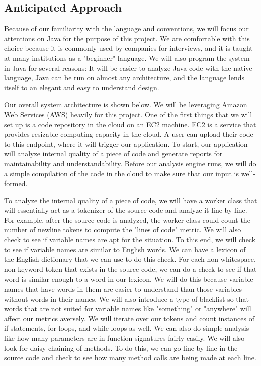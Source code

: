 \documentclass{sig-alternate}
\begin{document}
\subsection{Anticipated Approach}
\label{subsec:approach}
Because of our familiarity with the language and conventions, we will focus our attentions on Java for the purpose of this project. We are comfortable with this choice because it is commonly used by companies for interviews, and it is taught at many institutions as a "beginner" language. We will also program the system in Java for several reasons: It will be easier to analyze Java code with the native language, Java can be run on almost any architecture, and the language lends itself to an elegant and easy to understand design.

Our overall system architecture is shown below. We will be leveraging Amazon Web Services (AWS) heavily for this project. One of the first things that we will set up is a code repository in the cloud on an EC2 machine. EC2 is a service that provides resizable computing capacity in the cloud. A user can upload their code to this endpoint, where it will trigger our application. To start, our application will analyze internal quality of a piece of code and generate reports for maintainability and understandability. Before our analysis engine runs, we will do a simple compilation of the code in the cloud to make sure that our input is well-formed.

To analyze the internal quality of a piece of code, we will have a worker class that will essentially act as a tokenizer of the source code and analyze it line by line. For example, after the source code is analyzed, the worker class could count the number of newline tokens to compute the "lines of code" metric. We will also check to see if variable names are apt for the situation. To this end, we will check to see if variable names are similar to English words. We can have a lexicon of the English dictionary that we can use to do this check. For each non-whitespace, non-keyword token that exists in the source code, we can do a check to see if that word is similar enough to a word in our lexicon. We will do this because variable names that have words in them are easier to understand than those variables without words in their names. We will also introduce a type of blacklist so that words that are not suited for variable names like "something" or "anywhere" will affect our metrics aversely. We will iterate over our tokens and count instances of if-statements, for loops, and while loops as well. We can also do simple analysis like how many parameters are in function signatures fairly easily. We will also look for daisy chaining of methods. To do this, we can go line by line in the source code and check to see how many method calls are being made at each line. 
\end{document}

